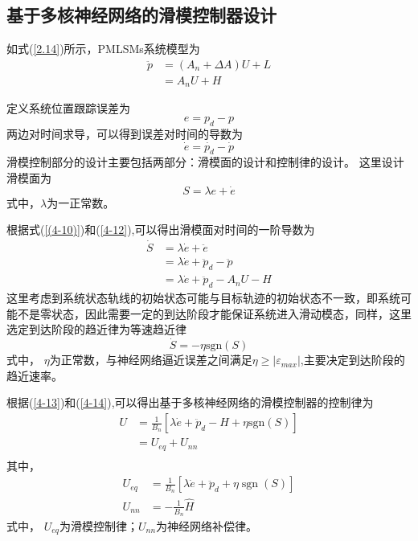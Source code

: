 \subsection{基于多核神经网络的滑模控制器设计}
如式(\ref{2.14})所示，PMLSMs系统模型为
\begin{equation}
\label{(4-10)}
\begin{aligned}
\ddot{p}&=({{A}_{n}}+\Delta A)U+L \\ 
&={A}_{n}U+H  
\end{aligned}
\end{equation}

定义系统位置跟踪误差为
\begin{equation}
\label{4-11}
e=p_d-p
\end{equation}
两边对时间求导，可以得到误差对时间的导数为
\begin{equation}
\label{4-12}
\dot{e}=\dot{p_d}-\dot{p}
\end{equation}
滑模控制部分的设计主要包括两部分：滑模面的设计和控制律的设计。
这里设计滑模面为
\begin{equation}
\label{4-13}
S=\lambda e+\dot{e}
\end{equation}
式中，$\lambda$为一正常数。

根据式(\ref{(4-10)})和(\ref{4-12}),可以得出滑模面对时间的一阶导数为
\begin{equation}
\label{4-14}
\begin{aligned}
\dot{S}&=\lambda \dot{e}+\ddot{e} \\ 
&=\lambda\dot{e}+{{{\ddot{p}}}_{d}}-\ddot{p} \\ 
&=\lambda \dot{e}+{{{\ddot{p}}}_{d}}-{{A}_{n}}U-H  
\end{aligned}
\end{equation}
这里考虑到系统状态轨线的初始状态可能与目标轨迹的初始状态不一致，即系统可能不是零状态，因此需要一定的到达阶段才能保证系统进入滑动模态，同样，这里选定到达阶段的趋近律为等速趋近律
\begin{equation}
\dot{S}=-\eta\text{sgn}(S)
\end{equation}
式中，
$\eta$为正常数，与神经网络逼近误差之间满足$\eta\ge\left|\varepsilon_{max}\right|$,主要决定到达阶段的趋近速率。

根据(\ref{4-13})和(\ref{4-14}),可以得出基于多核神经网络的滑模控制器的控制律为
\begin{equation}
\label{4-16}
\begin{aligned}
U& =\frac{1}{{{B}_{n}}}[\lambda \dot{e}+{{{\ddot{p}}}_{d}}-\hat{H}+\eta \text{sgn} (S)] \\ 
& ={{U}_{eq}}+{{U}_{nn}} \\ 
\end{aligned}
\end{equation}
其中，
\begin{equation}
\label{4-17}
\begin{aligned}
U_{e q}&=\frac{1}{B_{n}}\left[\lambda \dot{e}+\ddot{p}_{d}+\eta \operatorname{sgn}(S)\right] \\
U_{n n}&=-\frac{1}{B_{n}} \hat{H}
\end{aligned}
\end{equation}
式中，
$U_{eq}$为滑模控制律；$U_{nn}$为神经网络补偿律。

